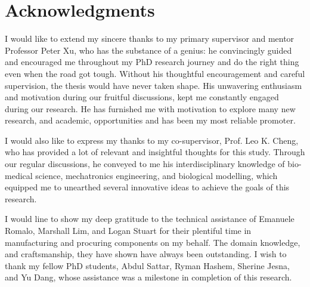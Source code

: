 



\bigskip

\begingroup
\let\clearpage\relax
\let\cleardoublepage\relax
\let\cleardoublepage\relax
\chapter*{Acknowledgments}
I would like to extend my sincere thanks to my primary supervisor and mentor Professor
Peter Xu, who has the substance of a genius: he convincingly guided and encouraged me throughout my PhD research journey and do the right thing even when the road got tough. Without his thoughtful encouragement and careful supervision, the thesis would have never taken shape. His unwavering enthusiasm and motivation during our fruitful discussions, kept me constantly engaged during our research. He has furnished me with motivation to explore many new research, and academic, opportunities and has been my most reliable promoter. 


I would also like to express my thanks to my co-supervisor, Prof. Leo K.
Cheng, who has provided a lot of relevant and insightful thoughts for this study. Through our regular discussions, he conveyed to me his interdisciplinary knowledge of bio-medical science, mechatronics engineering, and biological modelling, which equipped me to unearthed several innovative ideas to achieve the goals of this research. 

I would line to show my deep gratitude to the technical assistance of Emanuele Romalo, Marshall Lim, and Logan Stuart for their plentiful time in manufacturing and procuring components
on my behalf. The domain knowledge, and craftsmanship, they have shown have always been outstanding. I wish to thank my fellow PhD students, Abdul Sattar, Ryman Hashem, Sherine Jesna, and Yu Dang, whose assistance was a milestone in completion of this research.

